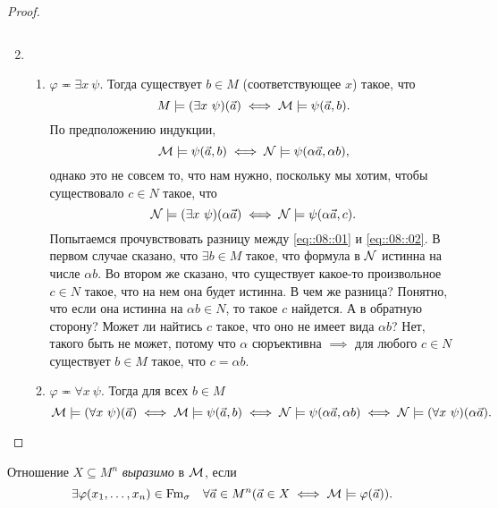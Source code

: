 \begin{proof}
\begin{enumerate}
\begin{enumerate}
$$        $$
        \end{enumerate}
        \item \begin{enumerate}
            \item $\varphi \eqcirc \exists x~ \psi$.
        Тогда существует $b \in M$ (соответствующее $x$) такое, что
        $$
            M \models (\exists x~\psi)(\vec{a}) \iff \mathcal{M} \models \psi(\vec{a}, b).
        $$
        По предположению индукции,
        \begin{equation} \label{eq::08::01}
            \mathcal{M} \models \psi(\vec{a}, b) \iff \mathcal{N} \models \psi (\alpha \vec{a}, \alpha b),
        \end{equation}
        однако это не совсем то, что нам нужно, поскольку мы хотим, чтобы существовало $c \in N$ такое, что
        \begin{equation} \label{eq::08::02}
            \mathcal{N} \models (\exists x~\psi)(\alpha \vec{a}) \iff \mathcal{N} \models \psi(\alpha \vec{a}, c).
        \end{equation}
        Попытаемся прочувствовать разницу между \eqref{eq::08::01} и \eqref{eq::08::02}.
        В первом случае сказано, что $\exists b \in M$ такое, что формула в $\mathcal{N}$ истинна на числе $\alpha b$.
        Во втором же сказано, что существует какое-то произвольное $c \in N$ такое, что на нем она будет истинна.
        В чем же разница?
        Понятно, что если она истинна на $\alpha b \in N$, то такое $c$ найдется.
        А в обратную сторону?
        Может ли найтись $c$ такое, что оно не имеет вида $\alpha b$?
        Нет, такого быть не может, потому что $\alpha$ сюръективна $\implies$ для любого $c \in N$ существует $b \in M$ такое, что $c = \alpha b$.
        \item $\varphi \eqcirc \forall x~\psi$.
        Тогда для всех $b \in M$
        $$
            \mathcal{M} \models (\forall x~\psi)(\vec{a}) \iff \mathcal{M} \models \psi(\vec{a}, b) \iff \mathcal{N} \models \psi(\alpha \vec{a}, \alpha b) \iff \mathcal{N} \models (\forall x~\psi)(\alpha \vec{a}).
        $$ \qedhere
        \end{enumerate}
    \end{enumerate}
\end{proof}

\begin{definition}
    Отношение $X \subseteq M^{n}$ {\it выразимо} в $\mathcal{M}$, если
    $$
        \exists \varphi(x_{1}, \ldots, x_{n}) \in \mathrm{Fm}_{\sigma} \quad \forall \vec{a} \in M^{n} (\vec{a} \in X \iff \mathcal{M} \models \varphi(\vec{a})).
    $$
\end{definition}

